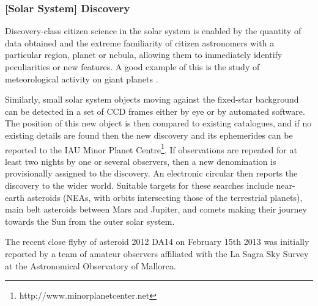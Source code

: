 \documentclass{ar2e}
\begin{document}

\subsubsection{[Solar System] Discovery}


Discovery-class citizen science in the solar system is enabled by the quantity
of data obtained and the extreme familiarity of citizen astronomers with a
particular region, planet or nebula, allowing them to immediately identify
peculiarities or new features. A good example of this is the study of meteorological activity on giant
planets \citep{95rogers}. 

Similarly, small solar system objects moving against the fixed-star background
can be detected in a set of CCD frames either by eye or by automated software. 
The position of this new object is then compared to existing catalogues, and if
no existing details are found then the new discovery and its ephemerides can be
reported to the IAU Minor Planet
Centre\footnote{http://www.minorplanetcenter.net}.  
If observations are repeated for at least two nights by one or several
observers, then a new denomination is provisionally assigned to the discovery.  
An electronic circular then reports the discovery to the wider world.  Suitable
targets for these searches include near-earth asteroids (NEAs, with orbits
intersecting those of the terrestrial planets), main belt asteroids between Mars
and Jupiter, and comets making their journey towards the Sun from the outer
solar system. 

The recent close flyby of asteroid 2012 DA14 on February 15th 2013 was
initially reported by a team of amateur observers affiliated with the La Sagra
Sky Survey at the Astronomical Observatory of Mallorca.
\end{document}
